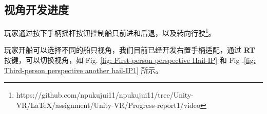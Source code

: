 \documentclass[a4paper,10pt]{article}
\begin{document}
		\subsection{视角开发进度}
		
		玩家通过按下手柄摇杆按钮控制船只前进和后退，以及转向行驶\footnote{https://github.com/npukujui11/npukujui11/tree/Unity-VR/LaTeX/assignment/Unity-VR/Progress-report1/video}。
		
		玩家开船可以选择不同的船只视角，我们目前已经开发右置手柄适配，通过 \textbf{RT} 按键，可以切换视角，如 Fig. \ref{fig: First-person perspective Hail-IP} 和 Fig .\ref{fig: Third-person perspective another hail-IP1} 所示。
		
		\begin{figure}[htbp] 
			\centering 
			

\end{figure}
\end{document}
